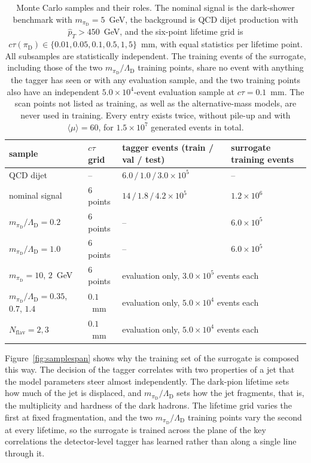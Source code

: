 \documentclass[a4paper,11pt]{article}
\newcommand{\ctau}{c\tau}
\newcommand{\pid}{\pi_{\mathrm{D}}}
\newcommand{\mpid}{m_{\pid}}
\begin{document}
\begin{table}[htbp]
  \centering
  \small
  \setlength{\tabcolsep}{3pt}
  \begin{tabular}{llll}
    \toprule
    sample & $\ctau$ grid & tagger events (train / val / test) & surrogate training events \\
    \midrule
    QCD dijet & -- & $6.0\,/\,1.0\,/\,3.0 \times 10^{5}$ & -- \\
    nominal signal & 6 points & $14\,/\,1.8\,/\,4.2 \times 10^{5}$ & $1.2\times10^{6}$ \\
    $\mpid/\Lambda_{\mathrm{D}} = 0.2$ & 6 points & -- & $6.0\times10^{5}$ \\
    $\mpid/\Lambda_{\mathrm{D}} = 1.0$ & 6 points & -- & $6.0\times10^{5}$ \\
    \midrule
    $\mpid = 10$, $2$~GeV & 6 points & \multicolumn{2}{l}{evaluation only, $3.0\times10^{5}$ events each} \\
    $\mpid/\Lambda_{\mathrm{D}} = 0.35$, $0.7$, $1.4$ & $0.1$~mm & \multicolumn{2}{l}{evaluation only, $5.0\times10^{4}$ events each} \\
    $N_{\mathrm{flav}} = 2, 3$ & $0.1$~mm & \multicolumn{2}{l}{evaluation only, $5.0\times10^{4}$ events each} \\
    \bottomrule
  \end{tabular}
  \caption{Monte Carlo samples and their roles. The nominal signal
  is the dark-shower benchmark with $\mpid = 5$~GeV, the background is
  QCD dijet production with $\hat p_T > 450$~GeV, and the six-point
  lifetime grid is
  $\ctau(\pid) \in \{0.01, 0.05, 0.1, 0.5, 1, 5\}$~mm, with equal
  statistics per lifetime point. All subsamples are statistically
  independent. The training events of the surrogate, including those
  of the two $\mpid/\Lambda_{\mathrm{D}}$ training points, share no
  event with anything the tagger has seen or with any evaluation
  sample, and the two training points also have an independent
  $5.0\times10^{4}$-event evaluation sample at $\ctau = 0.1$~mm. The
  scan points not listed as training, as well as the alternative-mass
  models, are never used in training. Every entry exists twice, without
  pile-up and with $\langle\mu\rangle = 60$, for $1.5\times10^{7}$
  generated events in total.}
  \label{tab:samples}
\end{table}

Figure~\ref{fig:samplespan} shows why the training set of the
surrogate is composed this way. The decision of the tagger correlates
with two properties of a jet that the model parameters steer almost
independently. The dark-pion lifetime sets how much of the jet is
displaced, and $\mpid/\Lambda_{\mathrm{D}}$ sets how the jet
fragments, that is, the multiplicity and hardness of the dark hadrons.
The lifetime grid varies the first at fixed fragmentation, and the two
$\mpid/\Lambda_{\mathrm{D}}$ training points vary the second at
every lifetime, so the surrogate is trained across the plane of the
key correlations the detector-level tagger has learned rather than
along a single line through it.
\end{document}
